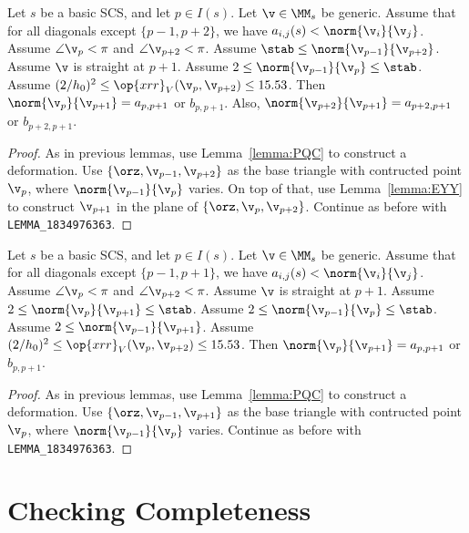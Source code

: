 \begin{lemma}[1834 str]\label{lemma:1834 str}
Let $s$ be a basic SCS, and let $p\in I(s)$.  Let $\v\in \MM_s$ be generic.
Assume that for all diagonals except $\{p-1,p+2\}$,
we have $a_{i,j}(s)<\norm{\v_i}{\v_j}$.  Assume $\angle \v_p < \pi$ and $\angle \v_{p+2} < \pi$.
Assume $\stab \le \norm{\v_{p-1}}{\v_{p+2}}$.
Assume $\v$ is straight at $p+1$.
Assume $2\le  \norm{\v_{p-1}}{\v_{p}}\le \stab$.
Assume $(2/h_0)^2 \le \op{xrr}_V (\v_p,\v_{p+2}) \le 15.53$.
Then $\norm{\v_p}{\v_{p+1}} = a_{p,p+1}$ or $b_{p,p+1}$.  Also,
 $\norm{\v_{p+2}}{\v_{p+1}} = a_{p+2,p+1}$ or $b_{p+2,p+1}$. 
\end{lemma}

\begin{proof} As in previous lemmas, use Lemma~\ref{lemma:PQC} to construct a deformation.
Use $\{\orz,\v_{p-1},\v_{p+2}\}$ as the base triangle with contructed point $\v_p$, where $\norm{\v_{p-1}}{\v_p}$ varies.
On top of that, use Lemma~\ref{lemma:EYY} to construct $\v_{p+1}$ in the plane of $\{\orz,\v_p,\v_{p+2}\}$.
Continue as before with {\tt LEMMA\_1834976363}.
\end{proof}

\begin{lemma}[1834]\label{lemma:1834}
Let $s$ be a basic SCS, and let $p\in I(s)$.  Let $\v\in \MM_s$ be generic.
Assume that for all diagonals except $\{p-1,p+1\}$,
we have $a_{i,j}(s)<\norm{\v_i}{\v_j}$.  Assume $\angle \v_p < \pi$ and $\angle \v_{p+2} < \pi$.
Assume $\v$ is straight at $p+1$.
Assume $2\le  \norm{\v_{p}}{\v_{p+1}}\le \stab$.
Assume $2\le \norm{\v_{p-1}}{\v_p}\le \stab$.
Assume $2 \le \norm{\v_{p-1}}{\v_{p+1}}$.
Assume $(2/h_0)^2 \le \op{xrr}_V (\v_p,\v_{p+2}) \le 15.53$.
Then $\norm{\v_p}{\v_{p+1}} = a_{p,p+1}$ or $b_{p,p+1}$.  
\end{lemma}

\begin{proof} As in previous lemmas, use Lemma~\ref{lemma:PQC} to construct a deformation.
Use $\{\orz,\v_{p-1},\v_{p+1}\}$ as the base triangle with contructed point $\v_p$, where $\norm{\v_{p-1}}{\v_p}$ varies.
Continue as before with {\tt LEMMA\_1834976363}.
\end{proof}


\newpage
\section{Checking Completeness}

\def\prop{$\text{pro}^+$\relax}
\def\proeight{$\text{pro}_8$\relax}

